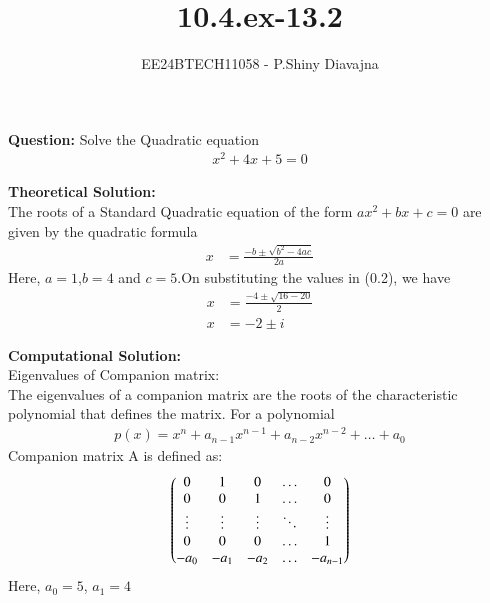 \documentclass[journal]{IEEEtran}
\begin{document}

\vspace{3cm}

\title{10.4.ex-13.2}
\author{EE24BTECH11058 - P.Shiny Diavajna}
{\let\newpage\relax\maketitle}

\renewcommand{\thefigure}{\theenumi}
\renewcommand{\thetable}{\theenumi}
\setlength{\intextsep}{10pt} %


\renewcommand{\thetable}{\theenumi}
\textbf{Question:} Solve the Quadratic equation 
\begin{align}
    x^2+4x+5=0
\end{align}

\textbf{Theoretical Solution:}\\
The roots of a Standard Quadratic equation of the form $ax^2+bx+c=0$ are given by the quadratic formula
\begin{align}
   x&=\frac{-b \pm \sqrt{b^2 - 4ac}}{2a}
\end{align}
Here, $a=1$,$b=4$ and $c=5$.On substituting the values in (0.2), we have 
\begin{align}
    x&= \frac{-4 \pm \sqrt{16-20}}{2}\\
    x&=-2 \pm i
\end{align}

\textbf{Computational Solution:}\\
Eigenvalues of Companion matrix:\\
The eigenvalues of a companion matrix are the roots of the characteristic polynomial that defines the matrix.
For a polynomial 
\begin{align}
    p(x)=x^n+a_{n-1}x^{n-1}+a_{n-2}x^{n-2}+ \dots +a_0
\end{align}Companion matrix A is defined as:
\begin{align}
    \begin{pmatrix}0&1&0&\dots &0 \\0&0&1&\dots&0\\\vdots&\vdots&\vdots&\ddots&\vdots\\0&0&0&\dots&1\\-a_0 & -a_1 & -a_2 & \dots & -a_{n-1}\end{pmatrix}
\end{align}
Here, $a_0 =5$, $a_1=4$ 
\end{document}

